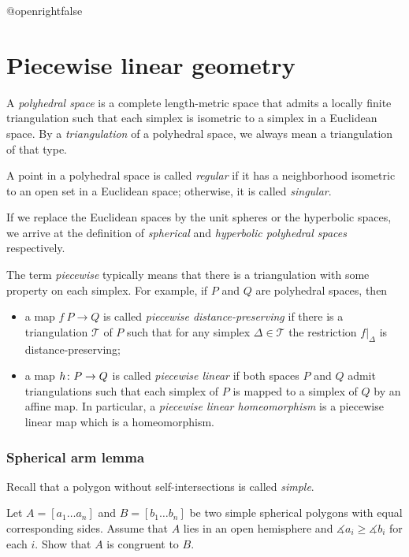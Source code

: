 \csname @openrightfalse\endcsname
\chapter{Piecewise linear geometry}


A \emph{polyhedral space} is a complete length-metric space that admits a locally finite triangulation 
such that each simplex is isometric to a simplex in a Euclidean space.
By a {}\emph{triangulation} of a polyhedral space, we always mean a triangulation of that type. 

A point in a polyhedral space is called \emph{regular} if it has a neighborhood isometric to an open set in a Euclidean space;
otherwise, it is called {}\emph{singular}.

If we replace the Euclidean spaces by the unit spheres or the hyperbolic spaces,
we arrive at the definition of {}\emph{spherical} and {}\emph{hyperbolic polyhedral spaces} respectively.

The term \emph{piecewise} typically means that there is a triangulation with some property on each simplex.
For example,  if $P$ and $Q$ are polyhedral spaces, then
\begin{itemize}
\item a map $f\:P\to Q$ is called {}\emph{piecewise distance-preserving} if there is a triangulation $\mathcal{T}$ of $P$ such that for any simplex $\Delta\in \mathcal{T}$ the restriction $f|_\Delta$ is distance-preserving;
\item a map $h\:P\z\to Q$  is called {}\emph{piecewise linear} if both spaces $P$ and $Q$ admit triangulations such that each simplex of $P$ is mapped to a simplex of $Q$ by an affine map.
In particular, a {}\emph{piecewise linear homeomorphism} is a piecewise linear map which is a homeomorphism.\label{piecewise linear map}
\end{itemize}





\subsection*{Spherical arm lemma}\label{Spherical arm lemma}

Recall that a polygon without self-intersections is called \emph{simple}.

\begin{pr}
Let $A=[a_1\ldots a_n]$ and $B=[b_1\ldots b_n]$ be two simple spherical polygons
with equal corresponding sides.
Assume that $A$ lies in an open hemisphere and $\measuredangle a_i\ge\measuredangle b_i$ for each $i$.
Show that $A$ is congruent to $B$.
\end{pr}

